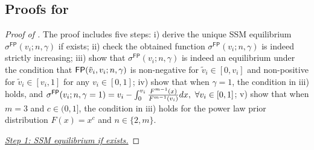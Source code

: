 \subsection{Proofs for }
\begin{proof}[Proof of ]
The proof includes five steps: i) derive the unique SSM equilibrium $\sigma^{\mathsf{FP}}(v_i;n,\gamma)$ if exists; ii) check the obtained function $\sigma^{\mathsf{FP}}(v_i;n,\gamma)$ is indeed strictly increasing; iii) show that $\sigma^{\mathsf{FP}}(v_i;n,\gamma)$ is indeed an equilibrium under the condition that $\mathsf{FP}(\tilde{v}_i,v_i;n,\gamma)$ is non-negative for $\tilde{v}_i\in [0,v_i]$ and non-positive for $\tilde{v}_i\in [v_i,1]$ for any $v_i\in [0,1]$; iv) show that when $\gamma = 1$, the condition in iii) holds, and $\sigma^{\mathsf{FP}}(v_i;n,\gamma=1) = v_i - \int_0^{v_i} \frac{F^{m-1}(x)}{F^{m-1}(v_i)}  dx,~\forall v_i\in [0,1]$; v) show that when $m=3$ and $c\in (0,1]$, the condition in iii) holds for the power law prior distribution $F(x)=x^c$ and  $n\in \{2,m\}$.

 \medskip

\noindent\textit{\underline{Step 1: SSM equilibrium if exists.}}

 \medskip


\end{proof}
